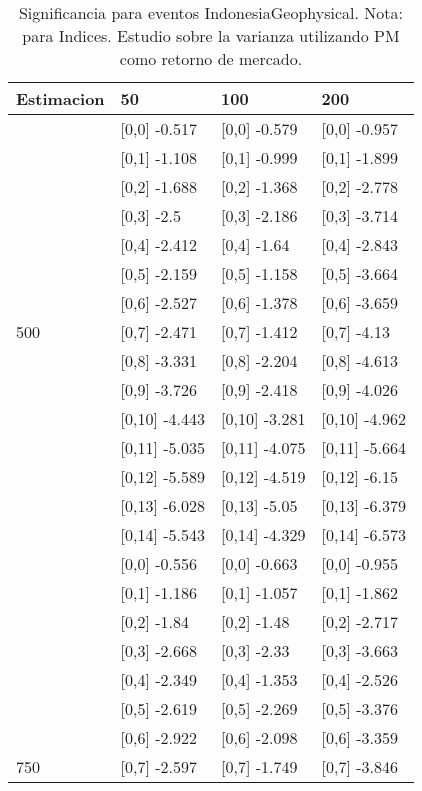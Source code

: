 \begin{table}

\caption{Significancia para eventos IndonesiaGeophysical. Nota: para Indices. Estudio sobre la varianza utilizando PM como retorno de mercado.}
\centering
\begin{tabular}[t]{llll}
\toprule
Estimacion & 50 & 100 & 200\\
\midrule
 & {}[0,0] -0.517 & {}[0,0] -0.579 & {}[0,0] -0.957\\
 & {}[0,1] -1.108 & {}[0,1] -0.999 & {}[0,1] -1.899\\
 & {}[0,2] -1.688 & {}[0,2] -1.368 & {}[0,2] -2.778\\
 & {}[0,3] -2.5 & {}[0,3] -2.186 & {}[0,3] -3.714\\
 & {}[0,4] -2.412 & {}[0,4] -1.64 & {}[0,4] -2.843\\
\addlinespace
 & {}[0,5] -2.159 & {}[0,5] -1.158 & {}[0,5] -3.664\\
 & {}[0,6] -2.527 & {}[0,6] -1.378 & {}[0,6] -3.659\\
500 & {}[0,7] -2.471 & {}[0,7] -1.412 & {}[0,7] -4.13\\
 & {}[0,8] -3.331 & {}[0,8] -2.204 & {}[0,8] -4.613\\
 & {}[0,9] -3.726 & {}[0,9] -2.418 & {}[0,9] -4.026\\
\addlinespace
 & {}[0,10] -4.443 & {}[0,10] -3.281 & {}[0,10] -4.962\\
 & {}[0,11] -5.035 & {}[0,11] -4.075 & {}[0,11] -5.664\\
 & {}[0,12] -5.589 & {}[0,12] -4.519 & {}[0,12] -6.15\\
 & {}[0,13] -6.028 & {}[0,13] -5.05 & {}[0,13] -6.379\\
 & {}[0,14] -5.543 & {}[0,14] -4.329 & {}[0,14] -6.573\\
\addlinespace
 & {}[0,0] -0.556 & {}[0,0] -0.663 & {}[0,0] -0.955\\
 & {}[0,1] -1.186 & {}[0,1] -1.057 & {}[0,1] -1.862\\
 & {}[0,2] -1.84 & {}[0,2] -1.48 & {}[0,2] -2.717\\
 & {}[0,3] -2.668 & {}[0,3] -2.33 & {}[0,3] -3.663\\
 & {}[0,4] -2.349 & {}[0,4] -1.353 & {}[0,4] -2.526\\
\addlinespace
 & {}[0,5] -2.619 & {}[0,5] -2.269 & {}[0,5] -3.376\\
 & {}[0,6] -2.922 & {}[0,6] -2.098 & {}[0,6] -3.359\\
750 & {}[0,7] -2.597 & {}[0,7] -1.749 & {}[0,7] -3.846\\

\end{tabular}
\end{table}
